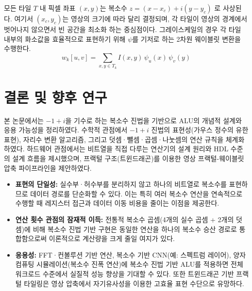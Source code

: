 \documentclass[10pt,a4paper,notitlepage]{report}
\begin{document}
\begin{multicols*}{2}
모든 타일 $T$ 내 픽셀 좌표 $(x, y)$는 복소수 $z = (x - x_c) + i (y - y_c)$ 로 사상된다. 여기서 $(x_c, y_c)$는 영상의 크기에 따라 달리 결정되며, 각 타일이 영상의 경계에서 벗어나지 않으면서 빈 공간을 최소화 하는 중심점이다. 그레이스케일의 경우 각 타일 내부의 화소값을 효율적으로 표현하기 위해 $\psi$를 기저로 하는 2차원 웨이블릿 변환을 수행한다.
$$
w_k[u, v] = \sum_{x, y \in T_k} I(x, y) \, \psi_{u}(x)\, \psi_{v}(y)
$$

\section{결론 및 향후 연구}
본 논문에서는 $-1+i$을 기수로 하는 복소수 진법을 기반으로 ALU의 개념적 설계와 응용 가능성을 정리하였다. 수학적 관점에서 $-1+i$ 진법의 표현성(가우스 정수의 유한 표현), 자리수 변환 알고리즘, 그리고 덧셈·뺄셈·곱셈·나눗셈의 연산 규칙을 체계화하였다. 하드웨어 관점에서는 비트열을 직접 다루는 연산기의 설계 원리와 HDL 수준의 설계 흐름을 제시했으며, 프랙털 구조(트윈드래곤)를 이용한 영상 프랙털-웨이블릿 압축 파이프라인을 제안하였다.
\begin{itemize}
\item \textbf{표현의 단일성:} 실수부·허수부를 분리하지 않고 하나의 비트열로 복소수를 표현하므로 데이터 경로를 단순화할 수 있다. 이는 특히 여러 복소수 연산을 연속적으로 수행할 때 레지스터 접근과 데이터 이동 비용을 줄이는 이점을 제공한다.
\item \textbf{연산 횟수 관점의 잠재적 이득:} 전통적 복소수 곱셈(4개의 실수 곱셈 + 2개의 덧셈)에 비해 복소수 진법 기반 구현은 동일한 연산을 하나의 복소수 승산 경로로 통합함으로써 이론적으로 계산량을 크게 줄일 여지가 있다.
\item \textbf{응용성:} FFT·컨볼루션 기반 연산, 복소수 기반 CNN(예: 스펙트럼 레이어), 양자컴퓨팅 시뮬레이션(복소수 진폭 연산)에 복소수 진법 기반 ALU를 적용하면 전체 워크로드 수준에서 실질적 성능 향상을 기대할 수 있다. 또한 트윈드래곤 기반 프랙털 타일링은 영상 압축에서 자기유사성을 이용한 고효율 표현 수단으로 유망하다.
\end{itemize}
\vspace{0.4cm}


\end{multicols*}
\end{document}
